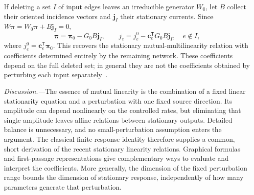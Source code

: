 \documentclass[
  reprint,
  superscriptaddress,
  amsmath,
  amssymb,
  aps,
  pre,
  longbibliography
]{revtex4-2}
\def\mathcal{}%
\begin{document}
If deleting a set $\mathcal I$ of input edges leaves an irreducible
generator $W_0$, let $B$ collect their oriented incidence vectors and
$\bm j_{\mathcal I}$ their stationary currents. Since
$W\bm\pi=W_0\bm\pi+B\bm j_{\mathcal I}=0$,
\begin{equation}
 \boxed{\bm\pi=\bm\pi_0-G_0B\bm j_{\mathcal I},\qquad
 j_e=j_e^0-\bm c_e^{\mathsf T}G_0B\bm j_{\mathcal I},
 \quad e\notin\mathcal I,}
 \label{eq:multiple}
\end{equation}
where $j_e^0=\bm c_e^{\mathsf T}\bm\pi_0$.
This recovers the stationary mutual-multilinearity relation
\cite{DalCengio2025} with coefficients determined entirely by the
remaining network. These coefficients depend on the full deleted set;
in general they are not the coefficients obtained by perturbing each
input separately~\cite{Khodabandehlou2025}.

\textit{Discussion.---}The essence of mutual linearity is the
combination of a fixed linear stationarity equation and a perturbation
with one fixed source direction. Its amplitude can depend nonlinearly
on the controlled rates, but eliminating that single amplitude leaves
affine relations between stationary outputs. Detailed balance is
unnecessary, and no small-perturbation assumption enters the argument.
The classical finite-response identity therefore supplies a common,
short derivation of the recent stationary linearity relations. Graphical formulas
and first-passage representations give complementary ways to evaluate
and interpret the coefficients. More generally, the dimension of the
fixed perturbation range bounds the dimension of stationary response,
independently of how many parameters generate that perturbation.


\end{document}
